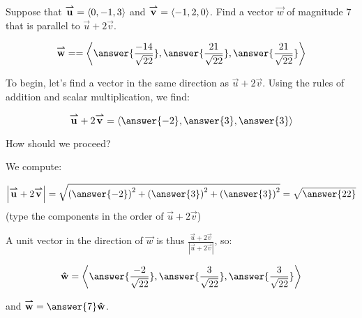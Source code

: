 \documentclass{ximera}
\author{Jim Talamo}
\begin{document}
\begin{exercise}
Suppose that ${\overset{\boldsymbol{\rightharpoonup}}{\mathbf{u}}} = \left\langle 0,-1,3\right\rangle$ and ${\overset{\boldsymbol{\rightharpoonup}}{\mathbf{v}}} = \left\langle -1,2,0\right\rangle$.  Find a vector $\vec{w}$ of magnitude $7$ that is parallel to $\vec{u}+2\vec{v}$.

\[
\vec{w} == \vector{\answer{\frac{-14}{\sqrt{22}} }, \answer{ \frac{21}{\sqrt{22}} } , \answer{ \frac{21}{\sqrt{22}} }}
\]

\begin{hint}
To begin, let's find a vector in the same direction as $\vec{u}+2\vec{v}$.  Using the rules of addition and scalar multiplication, we find:

\[
\vec{u}+2\vec{v} = \vector{\answer{-2} , \answer{3} , \answer{3}}
\]

How should we proceed?

\begin{multipleChoice}
\end{multipleChoice}

We compute:

\[
\left|\vec{u}+2\vec{v}\right| = \sqrt{\left( \answer{-2} \right)^2+\left(  \answer{3} \right)^2+\left(  \answer{3}\right)^2 }  = \sqrt{\answer{22}}
\]
(type the components in the order of $\vec{u}+2\vec{v}$)

A unit vector in the direction of $\vec{w}$ is thus $\frac{\vec{u}+2\vec{v}}{\left|\vec{u}+2\vec{v}\right|}$, so:

\[
\uvec{w} = \vector{\answer{\frac{-2}{\sqrt{22}} }, \answer{ \frac{3}{\sqrt{22}} } , \answer{ \frac{3}{\sqrt{22}} }}
\]

and  $\vec{w} = \answer{7} \uvec{w}$.
\end{hint}

\end{exercise}
\end{document}
